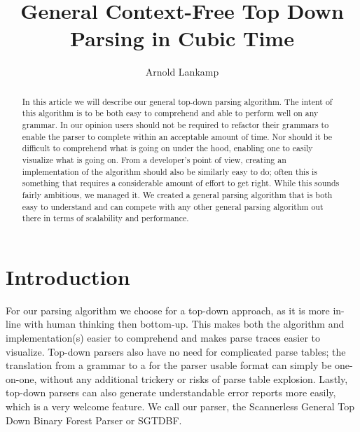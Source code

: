 \documentclass[a4paper,10pt]{article}
\title{General Context-Free Top Down Parsing in Cubic Time}
\author{Arnold Lankamp}
\begin{document}
\maketitle

\pagebreak
\begin{abstract}

In this article we will describe our general top-down parsing algorithm. The intent of this algorithm is to be both easy to comprehend and able to perform well on any grammar. In our opinion users should not be required to refactor their grammars to enable the parser to complete within an acceptable amount of time. Nor should it be difficult to comprehend what is going on under the hood, enabling one to easily visualize what is going on. From a developer's point of view, creating an implementation of the algorithm should also be similarly easy to do; often this is something that requires a considerable amount of effort to get right. While this sounds fairly ambitious, we managed it. We created a general parsing algorithm that is both easy to understand and can compete with any other general parsing algorithm out there in terms of scalability and performance.

\end{abstract}

\section{Introduction}

For our parsing algorithm we choose for a top-down approach, as it is more in-line with human thinking then bottom-up. This makes both the algorithm and implementation(s) easier to comprehend and makes parse traces easier to visualize. Top-down parsers also have no need for complicated parse tables; the translation from a grammar to a for the parser usable format can simply be one-on-one, without any additional trickery or risks of parse table explosion. Lastly, top-down parsers can also generate understandable error reports more easily, which is a very welcome feature. We call our parser, the Scannerless General Top Down Binary Forest Parser or SGTDBF.
\end{document}
